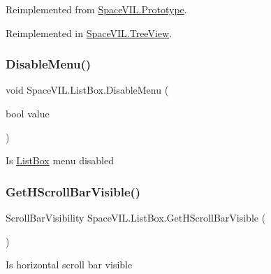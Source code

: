 Reimplemented from \mbox{\hyperlink{class_space_v_i_l_1_1_prototype}{Space\+V\+I\+L.\+Prototype}}.



Reimplemented in \mbox{\hyperlink{class_space_v_i_l_1_1_tree_view_ab810906945c91dc1db571b446ea2f6a0}{Space\+V\+I\+L.\+Tree\+View}}.

\mbox{\label{class_space_v_i_l_1_1_list_box_a58e7bc1eb9a5846673a2d8b043dc66ed}} 
\subsubsection{\texorpdfstring{Disable\+Menu()}{DisableMenu()}}
{\footnotesize\ttfamily void Space\+V\+I\+L.\+List\+Box.\+Disable\+Menu (\begin{DoxyParamCaption}\item[{bool}]{value }\end{DoxyParamCaption})\hspace{0.3cm}{\ttfamily [inline]}}



Is \mbox{\hyperlink{class_space_v_i_l_1_1_list_box}{List\+Box}} menu disabled 

\mbox{\label{class_space_v_i_l_1_1_list_box_aa27ff72c81f6d24e1c5bcb325721f07d}} 
\subsubsection{\texorpdfstring{Get\+H\+Scroll\+Bar\+Visible()}{GetHScrollBarVisible()}}
{\footnotesize\ttfamily Scroll\+Bar\+Visibility Space\+V\+I\+L.\+List\+Box.\+Get\+H\+Scroll\+Bar\+Visible (\begin{DoxyParamCaption}{ }\end{DoxyParamCaption})\hspace{0.3cm}{\ttfamily [inline]}}



Is horizontal scroll bar visible 

